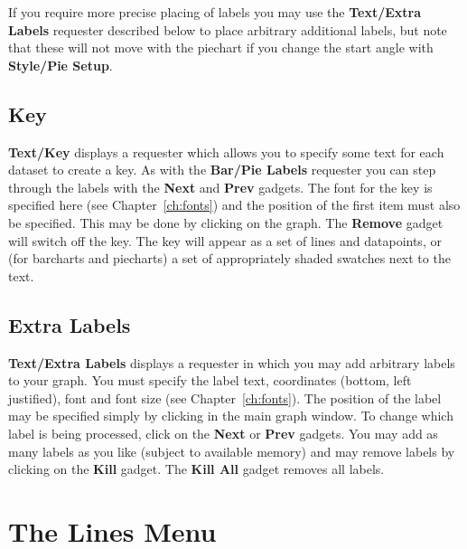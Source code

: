 If you require more precise placing of labels you may use the {\bf Text/Extra Labels}
requester described below to place arbitrary additional labels, but note that these 
will not move with the piechart if you change the start angle with {\bf Style/Pie 
Setup}.


\subsection{Key}
{\bf Text/Key} displays a requester which allows you to specify 
some text for 
each dataset to create a key. As with the {\bf Bar/Pie Labels} requester you can 
step through the labels with the {\bf Next} and {\bf Prev} gadgets. The font for 
the key is specified here (see Chapter~\ref{ch:fonts}) and the position of the 
first item must also be specified.
This may be done by clicking on the graph. The {\bf Remove} gadget will switch off 
the key. The key will appear as a set of lines and datapoints, or (for barcharts 
and piecharts) a set of appropriately shaded swatches next to the text.


\subsection{Extra Labels}
\label{ss:linlab}
{\bf Text/Extra Labels}  displays a requester in which you may 
add arbitrary labels to your graph.
You must specify the label text, coordinates (bottom, left justified), 
font and font size (see Chapter~\ref{ch:fonts}).
The position of the label may be specified simply by clicking in the main graph 
window.
To change which label is being processed, click on the {\bf Next} or {\bf Prev}
gadgets. You may add as many labels as you like (subject to available memory) and 
may remove labels by clicking on the {\bf Kill} gadget. The {\bf Kill All} gadget 
removes all labels.



\section{The Lines Menu}

